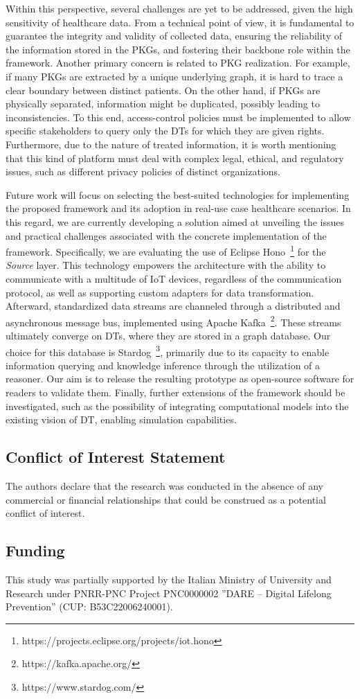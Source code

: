 Within this perspective, several challenges are yet to be addressed, given the high sensitivity of healthcare data. From a technical point of view, it is fundamental to guarantee the integrity and validity of collected data, ensuring the reliability of the information stored in the PKGs, and fostering their backbone role within the framework. Another primary concern is related to PKG realization. For example, if many PKGs are extracted by a unique underlying graph, it is hard to trace a clear boundary between distinct patients. On the other hand, if PKGs are physically separated, information might be duplicated, possibly leading to inconsistencies. To this end, access-control policies must be implemented to allow specific stakeholders to query only the DTs for which they are given rights.  
Furthermore, due to the nature of treated information, it is worth mentioning that this kind of platform must deal with complex legal, ethical, and regulatory issues, such as different privacy policies of distinct organizations. 

Future work will focus on selecting the best-suited technologies for implementing the proposed framework and its adoption in real-use case healthcare scenarios. In this regard, we are currently developing a solution aimed at unveiling the issues and practical challenges associated with the concrete implementation of the framework. Specifically, we are evaluating the use of Eclipse Hono~\footnote{https://projects.eclipse.org/projects/iot.hono} for the \textit{Source} layer. This technology empowers the architecture with the ability to communicate with a multitude of IoT devices, regardless of the communication protocol, as well as supporting custom adapters for data transformation. 
Afterward, standardized data streams are channeled through a distributed and asynchronous message bus, implemented using Apache Kafka~\footnote{https://kafka.apache.org/}. These streams ultimately converge on DTs, where they are stored in a graph database. Our choice for this database is Stardog~\footnote{https://www.stardog.com/}, primarily due to its capacity to enable information querying and knowledge inference through the utilization of a reasoner.
Our aim is to release the resulting prototype as open-source software for readers to validate them. Finally, further extensions of the framework should be investigated, such as the possibility of integrating computational models into the existing vision of DT, enabling simulation capabilities.

\subsection*{Conflict of Interest Statement}
The authors declare that the research was conducted in the absence of any commercial or financial relationships that could be construed as a potential conflict of interest.

\subsection*{Funding}
This study was partially supported by the Italian Ministry of University and Research under PNRR-PNC Project PNC0000002 ”DARE – Digital Lifelong Prevention” (CUP: B53C22006240001).

\FloatBarrier
